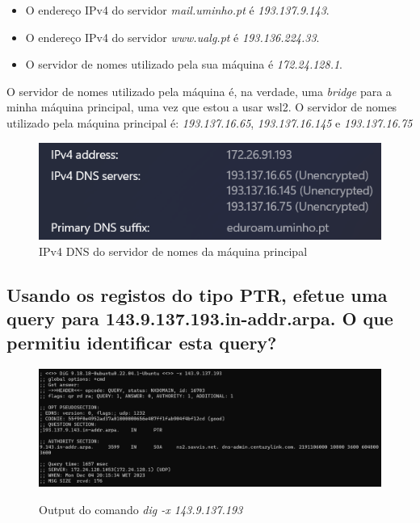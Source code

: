 \begin{itemize}
    \item O endereço IPv4 do servidor \textit{mail.uminho.pt} é \textit{193.137.9.143}.
    \item O endereço IPv4 do servidor \textit{www.ualg.pt} é \textit{193.136.224.33}.
    \item O servidor de nomes utilizado pela sua máquina é \textit{172.24.128.1}.
\end{itemize}

O servidor de nomes utilizado pela máquina é, na verdade, uma \textit{bridge} para a 
minha máquina principal, uma vez que estou a usar wsl2. O servidor de nomes utilizado 
pela máquina principal é: 
\textit{193.137.16.65}, \textit{193.137.16.145} e \textit{193.137.16.75}

\begin{figure} [h!]
    \centering
    \includegraphics[width=1\textwidth]{images/ex1.windows.png}
    \caption{\label{fig:windows}IPv4 DNS do servidor de nomes da máquina principal}
\end{figure}

\subsection{Usando os registos do tipo PTR, efetue uma query para 
143.9.137.193.in-addr.arpa. O que permitiu identificar esta query?}

\begin{figure} [h!]
    \centering
    \includegraphics[width=1\textwidth]{images/ex2.143arpa.png}
    \caption{\label{fig:comando3}}Output do comando \textit{dig -x 143.9.137.193}
\end{figure}


